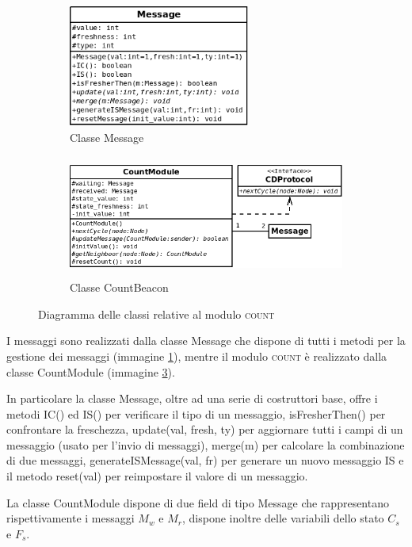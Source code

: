 \documentclass[a4paper,12pt]{article}
\begin{document}
\begin{figure}[ht]
\centering
\begin{subfigure}[b]{1\textwidth}
	\centering
	\includegraphics[height=4cm]{message_uml.png}
	\caption{Classe \textsf{Message}}
	\label{img:message_uml}
	\vspace{0.5cm}
\end{subfigure}
\begin{subfigure}[b]{1\textwidth}
	\centering
	\includegraphics[height=4cm]{count_uml.png}
	\caption{Classe \textsf{CountBeacon}}
	\label{img:count_uml}
\end{subfigure}
\caption{Diagramma delle classi relative al modulo \textsc{count}}
\end{figure}

I messaggi sono realizzati dalla classe \textsf{Message} che dispone di tutti i metodi per la gestione dei messaggi (immagine \ref{img:message_uml}), mentre il modulo \textsc{count} \`e realizzato dalla classe \textsf{CountModule} (immagine \ref{img:count_uml}).

In particolare la classe \textsf{Message}, oltre ad una serie di costruttori base, offre i metodi \textsf{IC()} ed \textsf{IS()} per verificare il tipo di un messaggio, \textsf{isFresherThen()} per confrontare la freschezza, \textsf{update(val, fresh, ty)} per aggiornare tutti i campi di un messaggio (usato per l'invio di messaggi), \textsf{merge(m)} per calcolare la combinazione di due messaggi, \textsf{generateISMessage(val, fr)} per generare un nuovo messaggio IS e il metodo \textsf{reset(val)} per reimpostare il valore di un messaggio.

La classe \textsf{CountModule} dispone di due field di tipo \textsf{Message} che rappresentano rispettivamente i messaggi $M_w$ e $M_r$, dispone inoltre delle variabili dello stato $C_s$ e $F_s$.
\end{document}
